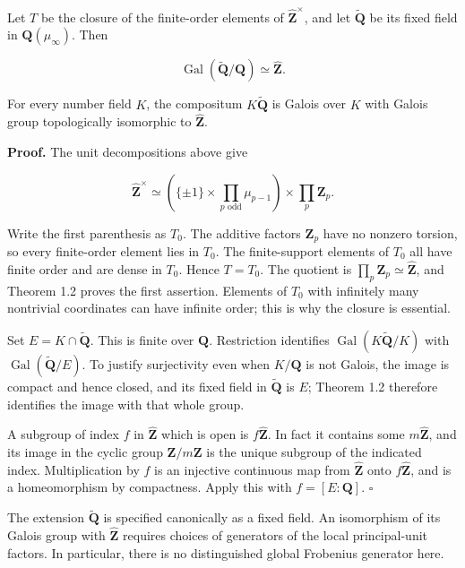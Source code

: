 \documentclass[11pt,a4paper]{article}
\begin{document}
Let \(T\) be the closure of the finite-order elements of
\(\widehat{\mathbf Z}^\times\), and let \(\widetilde{\mathbf Q}\) be its
fixed field in \(\mathbf Q(\mu_\infty)\). Then

\[
\operatorname{Gal}(\widetilde{\mathbf Q}/\mathbf Q)\simeq\widehat{\mathbf Z}.
\]

For every number field \(K\), the compositum \(K\widetilde{\mathbf Q}\)
is Galois over \(K\) with Galois group topologically isomorphic to
\(\widehat{\mathbf Z}\).

\textbf{Proof.} The unit decompositions above give

\[
\widehat{\mathbf Z}^\times\simeq
\left(\{\pm1\}\times\prod_{p\text{ odd}}\mu_{p-1}\right)
\times\prod_p\mathbf Z_p.
\]

Write the first parenthesis as \(T_0\). The additive factors
\(\mathbf Z_p\) have no nonzero torsion, so every finite-order element
lies in \(T_0\). The finite-support elements of \(T_0\) all have finite
order and are dense in \(T_0\). Hence \(T=T_0\). The quotient is
\(\prod_p\mathbf Z_p\simeq\widehat{\mathbf Z}\), and Theorem 1.2 proves
the first assertion. Elements of \(T_0\) with infinitely many nontrivial
coordinates can have infinite order; this is why the closure is
essential.

Set \(E=K\cap\widetilde{\mathbf Q}\). This is finite over \(\mathbf Q\).
Restriction identifies \(\operatorname{Gal}(K\widetilde{\mathbf Q}/K)\)
with \(\operatorname{Gal}(\widetilde{\mathbf Q}/E)\). To justify
surjectivity even when \(K/\mathbf Q\) is not Galois, the image is
compact and hence closed, and its fixed field in
\(\widetilde{\mathbf Q}\) is \(E\); Theorem 1.2 therefore identifies the
image with that whole group.

A subgroup of index \(f\) in \(\widehat{\mathbf Z}\) which is open is
\(f\widehat{\mathbf Z}\). In fact it contains some
\(m\widehat{\mathbf Z}\), and its image in the cyclic group
\(\mathbf Z/m\mathbf Z\) is the unique subgroup of the indicated index.
Multiplication by \(f\) is an injective continuous map from
\(\widehat{\mathbf Z}\) onto \(f\widehat{\mathbf Z}\), and is a
homeomorphism by compactness. Apply this with \(f=[E:\mathbf Q]\).
\(\square\)

The extension \(\widetilde{\mathbf Q}\) is specified canonically as a
fixed field. An isomorphism of its Galois group with
\(\widehat{\mathbf Z}\) requires choices of generators of the local
principal-unit factors. In particular, there is no distinguished global
Frobenius generator here.
\end{document}
